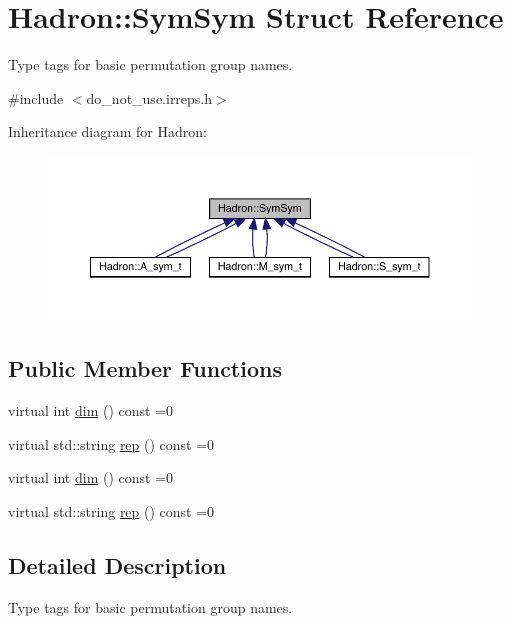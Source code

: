\hypertarget{structHadron_1_1SymSym}{}\section{Hadron\+:\+:Sym\+Sym Struct Reference}
\label{structHadron_1_1SymSym}


Type tags for basic permutation group names.  




{\ttfamily \#include $<$do\+\_\+not\+\_\+use.\+irreps.\+h$>$}



Inheritance diagram for Hadron\+:
\nopagebreak
\begin{figure}[H]
\begin{center}
\leavevmode
\includegraphics[width=350pt]{d7/db8/structHadron_1_1SymSym__inherit__graph}
\end{center}
\end{figure}
\subsection*{Public Member Functions}
\begin{DoxyCompactItemize}
\item 
virtual int \mbox{\hyperlink{structHadron_1_1SymSym_ae57780f41b9f6c03c6056eed3677bd48}{dim}} () const =0
\item 
virtual std\+::string \mbox{\hyperlink{structHadron_1_1SymSym_aa6e588740862036933a9efe085a5e5e5}{rep}} () const =0
\item 
virtual int \mbox{\hyperlink{structHadron_1_1SymSym_ae57780f41b9f6c03c6056eed3677bd48}{dim}} () const =0
\item 
virtual std\+::string \mbox{\hyperlink{structHadron_1_1SymSym_aa6e588740862036933a9efe085a5e5e5}{rep}} () const =0
\end{DoxyCompactItemize}


\subsection{Detailed Description}
Type tags for basic permutation group names. 

